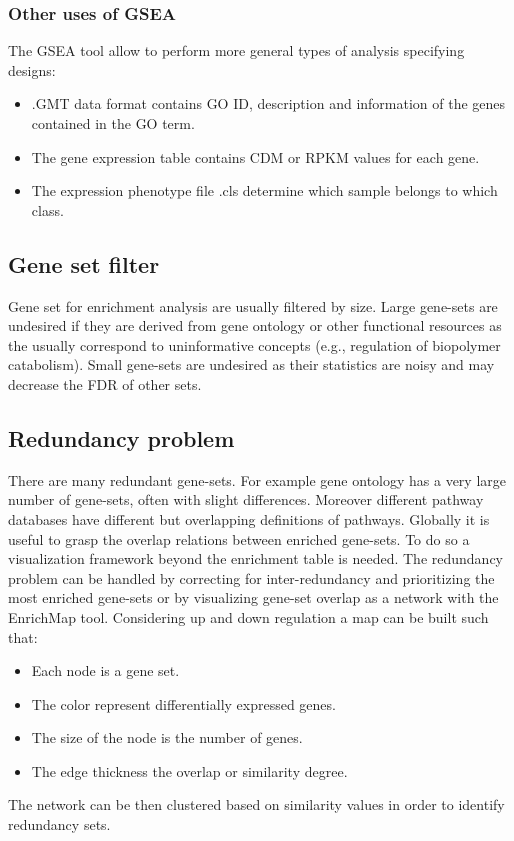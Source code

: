 		\subsubsection{Other uses of GSEA}
		The GSEA tool allow to perform more general types of analysis specifying designs:
		
			\begin{itemize}
				\item .GMT data format contains GO ID, description and information of the genes contained in the GO term.
				\item The gene expression table contains CDM or RPKM values for each gene.
				\item The expression phenotype file .cls determine which sample belongs to which class.
			\end{itemize}


	\subsection{Gene set filter}
	Gene set for enrichment analysis are usually filtered by size.
	Large gene-sets are undesired if they are derived from gene ontology or other functional resources as the usually correspond to uninformative concepts (e.g., regulation of biopolymer catabolism).
	Small gene-sets are undesired as their statistics are noisy and may decrease the FDR of other sets.

	\subsection{Redundancy problem}
	There are many redundant gene-sets.
	For example gene ontology has a very large number of gene-sets, often with slight differences.
	Moreover different pathway databases have different but overlapping definitions of pathways.
	Globally it is useful to grasp the overlap relations between enriched gene-sets.
	To do so a visualization framework beyond the enrichment table is needed.
	The redundancy problem can be handled by correcting for inter-redundancy and prioritizing the most enriched gene-sets or by visualizing gene-set overlap as a network with the EnrichMap tool.
	Considering up and down regulation a map can be built such that:

		\begin{itemize}
			\item Each node is a gene set.
			\item The color represent differentially expressed genes.
			\item The size of the node is the number of genes.
			\item The edge thickness the overlap or similarity degree.
		\end{itemize}
	
	The network can be then clustered based on similarity values in order to identify redundancy sets.
